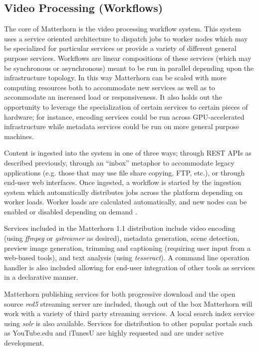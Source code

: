 \documentclass[letterpaper]{sig-alternate}
\begin{document}
\subsection{Video Processing (Workflows)}
The core of Matterhorn is the video processing workflow system.  This system uses a service oriented architecture to dispatch jobs to worker nodes which may be specialized for particular services or provide a variety of different general purpose services.  Workflows are linear compositions of these services (which may be synchronous or asynchronous) meant to be run in parallel depending upon the infrastructure topology.  In this way Matterhorn can be scaled with more computing resources both to accommodate new services as well as to accommodate an increased load or responsiveness.  It also holds out the opportunity to leverage the specialization of certain services to certain pieces of hardware; for instance, encoding services could be run across GPU-accelerated infrastructure while metadata services could be run on more general purpose machines.

Content is ingested into the system in one of three ways; through REST APIs as described previously, through an ``inbox'' metaphor to accommodate legacy applications (e.g. those that may use file share copying, FTP, etc.), or through end-user web interfaces.  Once ingested, a workflow is started by the ingestion system which automatically distributes jobs across the platform depending on worker loads.  Worker loads are calculated automatically, and new nodes can be enabled or disabled depending on demand .

Services included in the Matterhorn 1.1 distribution include video encoding (using \emph{ffmpeg} or \emph{gstreamer} as desired), metadata generation, scene detection, preview image generation, trimming and captioning (requiring user input from a web-based tools), and text analysis (using \emph{tesseract}).  A command line operation handler is also included allowing for end-user integration of other tools as services in a declarative manner.

Matterhorn publishing services for both progressive download and the open source \emph{red5} streaming server are included, though out of the box Matterhorn will work with a variety of third party streaming services.  A local search index service using \emph{solr} is also available.  Services for distribution to other popular portals such as YouTube.edu and iTunesU are highly requested and are under active development.
\end{document}
